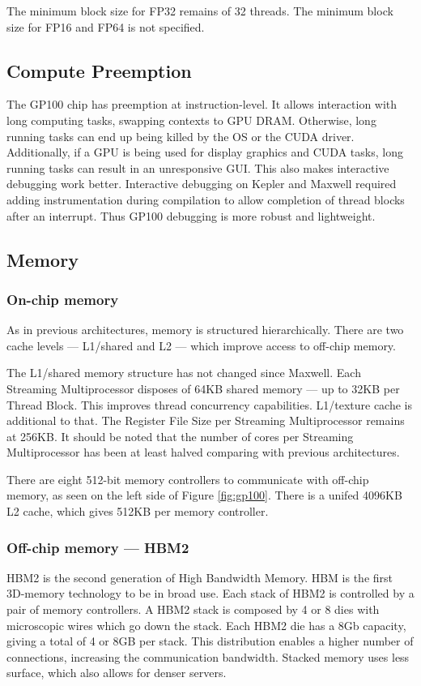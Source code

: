 The minimum block size for FP32 remains of 32 threads.
The minimum block size for FP16 and FP64 is not specified.

\subsection{Compute Preemption}
The GP100 chip has preemption at instruction-level.
It allows interaction with long computing tasks, swapping contexts to GPU DRAM.
Otherwise, long running tasks can end up being killed by the OS or the CUDA driver.
Additionally, if a GPU is being used for display graphics and CUDA tasks, long running tasks can result in an unresponsive GUI.
This also makes interactive debugging work better.
Interactive debugging on Kepler and Maxwell required adding instrumentation during compilation to allow completion of thread blocks after an interrupt.
Thus GP100 debugging is more robust and lightweight.

\subsection{Memory}
\subsubsection{On-chip memory}
As in previous architectures, memory is structured hierarchically.
There are two cache levels --- L1/shared and L2 --- which improve access to off-chip memory.

The L1/shared memory structure has not changed since Maxwell.
Each Streaming Multiprocessor disposes of 64KB shared memory --- up to 32KB per Thread Block.
This improves thread concurrency capabilities.
L1/texture cache is additional to that.
The Register File Size per Streaming Multiprocessor remains at 256KB.
It should be noted that the number of cores per Streaming Multiprocessor has been at least halved comparing with previous architectures.

There are eight 512-bit memory controllers to communicate with off-chip memory, as seen on the left side of Figure \ref{fig:gp100}.
There is a unifed 4096KB L2 cache, which gives 512KB per memory controller.

\subsubsection{Off-chip memory --- HBM2}
HBM2 is the second generation of High Bandwidth Memory.
HBM is the first 3D-memory technology to be in broad use.
Each stack of HBM2 is controlled by a pair of memory controllers.
A HBM2 stack is composed by 4 or 8 dies with microscopic wires which go down the stack.
Each HBM2 die has a 8Gb capacity, giving a total of 4 or 8GB per stack.
This distribution enables a higher number of connections, increasing the communication bandwidth.
Stacked memory uses less surface, which also allows for denser servers.

